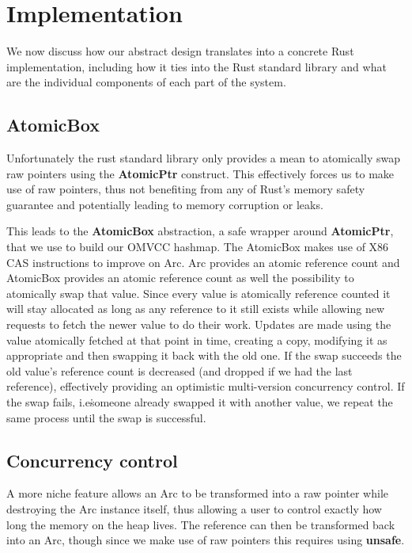 \documentclass[11pt]{article}
\begin{document}
\section{Implementation}

We now discuss how our abstract design translates into a concrete Rust
implementation, including how it ties into the Rust standard library
and what are the individual components of each part of the system.

\subsection{AtomicBox}

Unfortunately the rust standard library only provides a mean to
atomically swap raw pointers using the \textbf{AtomicPtr}
construct. This effectively forces us to make use of raw pointers,
thus not benefiting from any of Rust's memory safety guarantee and
potentially leading to memory corruption or leaks.

This leads to the \textbf{AtomicBox} abstraction, a safe wrapper
around \textbf{AtomicPtr}, that we use to build our OMVCC hashmap.
The AtomicBox makes use of X86 CAS instructions to improve on Arc.
Arc provides an atomic reference count and AtomicBox provides an
atomic reference count as well the possibility to atomically swap that
value. Since every value is atomically reference counted it will stay
allocated as long as any reference to it still exists while allowing
new requests to fetch the newer value to do their work. Updates are
made using the value atomically fetched at that point in time,
creating a copy, modifying it as appropriate and then swapping it back
with the old one. If the swap succeeds the old value's reference count
is decreased (and dropped if we had the last reference), effectively
providing an optimistic multi-version concurrency control. If the swap
fails, i.e\. someone already swapped it with another value, we repeat
the same process until the swap is successful.

\subsection{Concurrency control}
A more niche feature allows an Arc to be transformed into a
raw pointer while destroying the Arc instance itself, thus allowing
a user to control exactly how long the memory on the heap lives.
The reference can then be transformed back into an Arc, though since
we make use of raw pointers this requires using \textbf{unsafe}.
\end{document}
